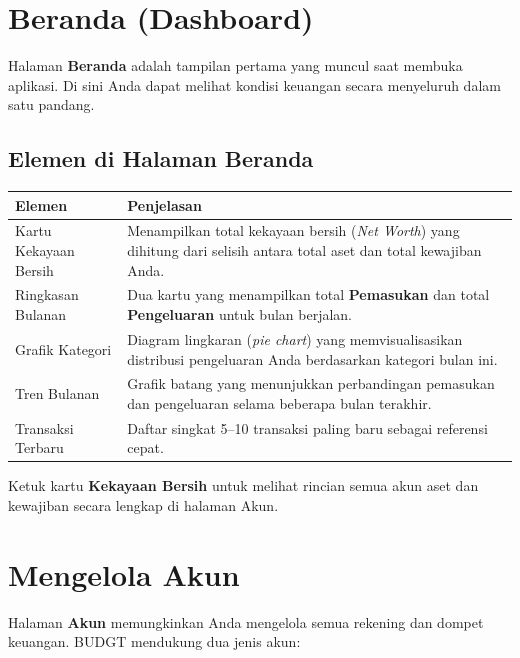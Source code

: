\documentclass[12pt, a4paper]{article}
\begin{document}
\section{Beranda (Dashboard)}

Halaman \textbf{Beranda} adalah tampilan pertama yang muncul saat membuka aplikasi. Di sini Anda dapat melihat kondisi keuangan secara menyeluruh dalam satu pandang.

\subsection{Elemen di Halaman Beranda}

\begin{longtable}{L{4cm} L{10cm}}
  \toprule
  \textbf{Elemen} & \textbf{Penjelasan} \\
  \midrule
  \endhead
  Kartu Kekayaan Bersih & Menampilkan total kekayaan bersih (\textit{Net Worth}) yang dihitung dari selisih antara total aset dan total kewajiban Anda. \\[4pt]
  Ringkasan Bulanan & Dua kartu yang menampilkan total \textbf{Pemasukan} dan total \textbf{Pengeluaran} untuk bulan berjalan. \\[4pt]
  Grafik Kategori & Diagram lingkaran (\textit{pie chart}) yang memvisualisasikan distribusi pengeluaran Anda berdasarkan kategori bulan ini. \\[4pt]
  Tren Bulanan & Grafik batang yang menunjukkan perbandingan pemasukan dan pengeluaran selama beberapa bulan terakhir. \\[4pt]
  Transaksi Terbaru & Daftar singkat 5--10 transaksi paling baru sebagai referensi cepat. \\
  \bottomrule
\end{longtable}

\begin{tipbox}
Ketuk kartu \textbf{Kekayaan Bersih} untuk melihat rincian semua akun aset dan kewajiban secara lengkap di halaman Akun.
\end{tipbox}

\section{Mengelola Akun}

Halaman \textbf{Akun} memungkinkan Anda mengelola semua rekening dan dompet keuangan. BUDGT mendukung dua jenis akun:
\end{document}
